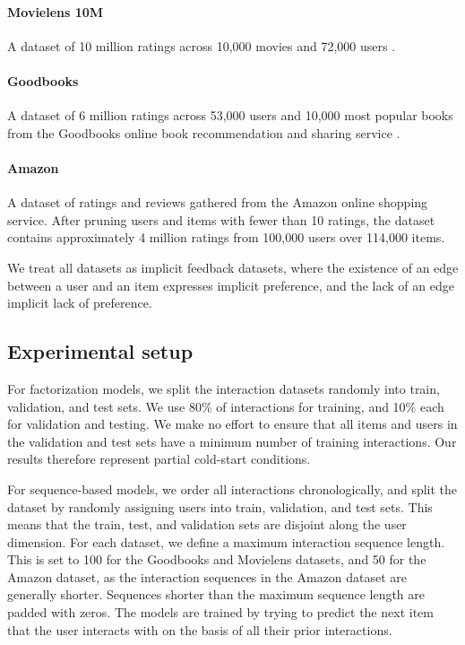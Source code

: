 \documentclass[sigconf]{acmart}
\begin{document}
\paragraph{Movielens 10M} A dataset of 10 million ratings across 10,000 movies and 72,000 users \citep{harper2016movielens}.
\paragraph{Goodbooks} A dataset of 6 million ratings across 53,000 users and 10,000 most popular books from the Goodbooks online book recommendation and sharing service \citep{goodbooks2017}.
\paragraph{Amazon} A dataset of ratings and reviews gathered from the Amazon online shopping service. After pruning users and items with fewer than 10 ratings, the dataset contains approximately 4 million ratings from 100,000 users over 114,000 items.

We treat all datasets as implicit feedback datasets, where the existence of an edge between a user and an item expresses implicit preference, and the lack of an edge implicit lack of preference.

\subsection{Experimental setup}
For factorization models, we split the interaction datasets randomly into train, validation, and test sets. We use 80\% of interactions for training, and 10\% each for validation and testing. We make no effort to ensure that all items and users in the validation and test sets have a minimum number of training interactions. Our results therefore represent partial cold-start conditions.

For sequence-based models, we order all interactions chronologically, and split the dataset by randomly assigning users into train, validation, and test sets. This means that the train, test, and validation sets are disjoint along the user dimension. For each dataset, we define a maximum interaction sequence length. This is set to 100 for the Goodbooks and Movielens datasets, and 50 for the Amazon dataset, as the interaction sequences in the Amazon dataset are generally shorter. Sequences shorter than the maximum sequence length are padded with zeros. The models are trained by trying to predict the next item that the user interacts with on the basis of all their prior interactions.
\end{document}
